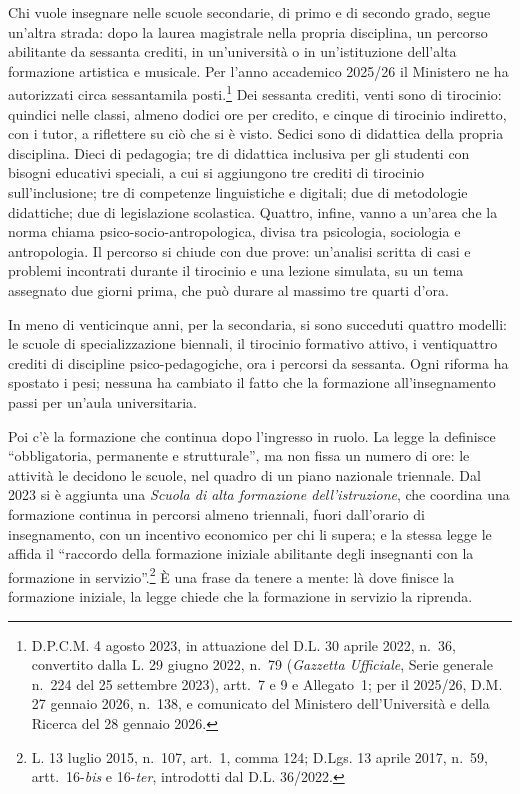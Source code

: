 Chi vuole insegnare nelle scuole secondarie, di primo e di secondo
grado, segue un'altra strada: dopo la laurea magistrale nella propria
disciplina, un percorso abilitante da sessanta crediti, in un'università
o in un'istituzione dell'alta formazione artistica e musicale. Per
l'anno accademico 2025/26 il Ministero ne ha autorizzati circa
sessantamila posti.\footnote{D.P.C.M. 4 agosto 2023, in attuazione del
D.L. 30 aprile 2022, n.~36, convertito dalla L. 29 giugno 2022, n.~79
(\emph{Gazzetta Ufficiale}, Serie generale n.~224 del 25 settembre
2023), artt.~7 e 9 e Allegato~1; per il 2025/26, D.M. 27 gennaio 2026,
n.~138, e comunicato del Ministero dell'Università e della Ricerca del
28 gennaio 2026.} Dei sessanta crediti, venti sono di tirocinio:
quindici nelle classi, almeno dodici ore per credito, e cinque di
tirocinio indiretto, con i tutor, a riflettere su ciò che si è visto.
Sedici sono di didattica della propria disciplina. Dieci di pedagogia;
tre di didattica inclusiva per gli studenti con bisogni educativi
speciali, a cui si aggiungono tre crediti di tirocinio sull'inclusione;
tre di competenze linguistiche e digitali; due di metodologie
didattiche; due di legislazione scolastica. Quattro, infine, vanno a
un'area che la norma chiama psico-socio-antropologica, divisa tra
psicologia, sociologia e antropologia. Il percorso si chiude con due
prove: un'analisi scritta di casi e problemi incontrati durante il
tirocinio e una lezione simulata, su un tema assegnato due giorni
prima, che può durare al massimo tre quarti d'ora.

In meno di venticinque anni, per la secondaria, si sono succeduti
quattro modelli: le scuole di specializzazione biennali, il tirocinio
formativo attivo, i ventiquattro crediti di discipline
psico-pedagogiche, ora i percorsi da sessanta. Ogni riforma ha
spostato i pesi; nessuna ha cambiato il fatto che la formazione
all'insegnamento passi per un'aula universitaria.

Poi c'è la formazione che continua dopo l'ingresso in ruolo. La legge
la definisce \enquote{obbligatoria, permanente e strutturale}, ma non
fissa un numero di ore: le attività le decidono le scuole, nel quadro
di un piano nazionale triennale. Dal 2023 si è aggiunta una
\emph{Scuola di alta formazione dell'istruzione}, che coordina una
formazione continua in percorsi almeno triennali, fuori dall'orario di
insegnamento, con un incentivo economico per chi li supera; e la
stessa legge le affida il \enquote{raccordo della formazione iniziale
abilitante degli insegnanti con la formazione in servizio}.\footnote{L.
13 luglio 2015, n.~107, art.~1, comma 124; D.Lgs. 13 aprile 2017,
n.~59, artt.~16-\emph{bis} e 16-\emph{ter}, introdotti dal D.L.
36/2022.} È una frase da tenere a mente: là dove finisce la formazione
iniziale, la legge chiede che la formazione in servizio la riprenda.

